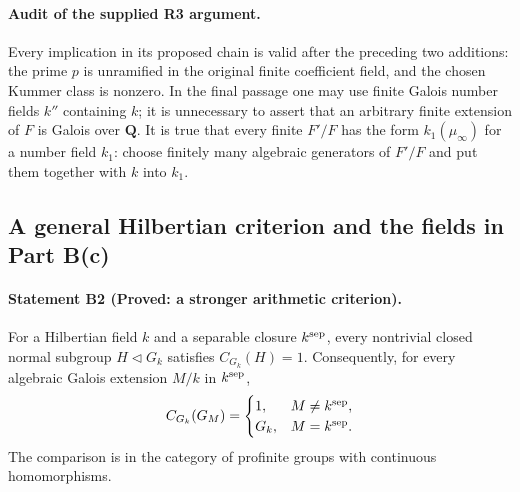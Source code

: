 \paragraph{Audit of the supplied R3 argument.}
Every implication in its proposed chain is valid after the preceding two
additions: the prime $p$ is unramified in the original finite coefficient
field, and the chosen Kummer class is nonzero. In the final passage one may
use finite Galois number fields $k''$ containing $k$; it is unnecessary to
assert that an arbitrary finite extension of $F$ is Galois over
$\mathbf Q$. It is true that every finite $F'/F$ has the form
$k_1(\mu_\infty)$ for a number field $k_1$: choose finitely many algebraic
generators of $F'/F$ and put them together with $k$ into $k_1$.

\subsection{A general Hilbertian criterion and the fields in Part B(c)}

\paragraph{Statement B2 (Proved: a stronger arithmetic criterion).}\label{res:B2}
For a Hilbertian field $k$ and a separable closure $k^{\rm sep}$, every
nontrivial closed normal subgroup $H\triangleleft G_k$ satisfies
$C_{G_k}(H)=1$. Consequently, for every algebraic Galois extension
$M/k$ in $k^{\rm sep}$,
\[
 C_{G_k}(G_M)=
 \begin{cases}
 1,&M\ne k^{\rm sep},\\
 G_k,&M=k^{\rm sep}.
 \end{cases}
\]
The comparison is in the category of profinite groups with continuous
homomorphisms.

